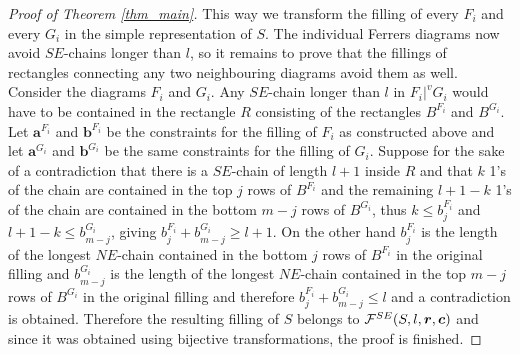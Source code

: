 \begin{proof}[Proof of Theorem \ref{thm_main}]
This way we transform the filling of every $F_i$ and every $G_i$ in the simple representation of $S$. The individual Ferrers
diagrams now avoid $SE$-chains longer than $l$, so it remains to prove that the fillings of rectangles connecting any two neighbouring diagrams
avoid them as well. Consider the diagrams $F_i$ and $G_i$. Any $SE$-chain longer than $l$ in $F_i |^v G_i$ would
have to be contained in the rectangle $R$ consisting of the rectangles $B^{F_i}$ and $B^{G_i}$.
Let $\bm{a}^{F_i}$ and $\bm{b}^{F_i}$ be the constraints for the filling of $F_i$ as constructed above
and let $\bm{a}^{G_i}$ and $\bm{b}^{G_i}$ be the same constraints for the filling of $G_i$. Suppose
for the sake of a contradiction that there is a $SE$-chain of length $l+1$ inside $R$ and that
$k$ 1's of the chain are contained in the top $j$ rows of $B^{F_i}$ and the remaining $l+1-k$ 1's of the chain
are contained in the bottom $m-j$ rows of $B^{G_i}$, thus $k \leq b^{F_i}_j$ and $l+1-k \leq b^{G_i}_{m-j}$,
giving $b^{F_i}_j + b^{G_i}_{m-j} \geq l+1$. On the other hand $b^{F_i}_j$ is the length of the longest $NE$-chain
contained in the bottom $j$ rows of $B^{F_i}$ in the original filling and $b^{G_i}_{m-j}$ is the length of the longest $NE$-chain
contained in the top $m-j$ rows of $B^{G_i}$ in the original filling and therefore $b^{F_i}_j + b^{G_i}_{m-j} \leq l$
and a contradiction is obtained. Therefore the resulting filling of $S$ belongs to $\mathcal{F}^{SE}(S, l, \bm{r}, \bm{c})$
and since it was obtained using bijective transformations, the proof is finished.
\end{proof}
